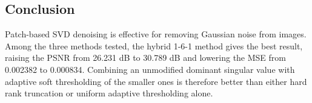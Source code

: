 \documentclass{article}
\begin{document}
\begin{flushleft}
\subsection*{Conclusion}
Patch-based SVD denoising is effective for removing Gaussian noise from images. Among the three methods tested, the hybrid 1-6-1 method gives the best result, raising the PSNR from 26.231 dB to 30.789 dB and lowering the MSE from 0.002382 to 0.000834. Combining an unmodified dominant singular value with adaptive soft thresholding of the smaller ones is therefore better than either hard rank truncation or uniform adaptive thresholding alone.

\end{flushleft}
\end{document}
